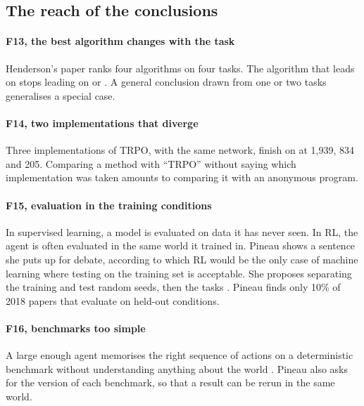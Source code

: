 \subsection{The reach of the conclusions}

\paragraph{F13, the best algorithm changes with the task}
Henderson's paper ranks four algorithms on four tasks. The algorithm that leads on
 stops leading on  or . A general conclusion drawn from
one or two tasks generalises a special case.

\paragraph{F14, two implementations that diverge}
Three implementations of TRPO, with the same network, finish on  at 1,939, 834
and 205. Comparing a method with \enquote{TRPO} without saying which implementation was taken amounts to
comparing it with an anonymous program.

\paragraph{F15, evaluation in the training conditions}
In supervised learning, a model is evaluated on data it has never seen. In RL, the agent is often
evaluated in the same world it trained in. Pineau shows a sentence she puts up for debate, according to
which RL would be the only case of machine learning where testing on the training set is acceptable.
She proposes separating the training and test random seeds, then the tasks
\parencite{zhang2018dissection,zhang2018natural}. Pineau finds only 10\% of 2018 papers that
evaluate on held-out conditions.

\paragraph{F16, benchmarks too simple}
A large enough agent memorises the right sequence of actions on a deterministic benchmark without
understanding anything about the world \parencite{machado2018revisiting}. Pineau also asks for the
version of each benchmark, so that a result can be rerun in the same world.

